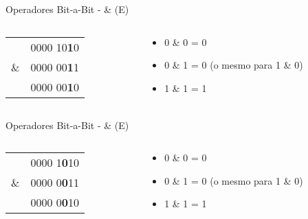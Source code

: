 \documentclass[t, aspectratio=169]{beamer}
\begin{document}
\begin{frame}[label={sec:org2089767}]{Operadores Bit-a-Bit - \& (E)}
\begin{columns}
\begin{column}{0.5\columnwidth}
\begin{center}
\begin{tabular}{cc}
 & 0000 10{\bfseries\color{highlight}1}0\\
\& & 0000 00{\bfseries\color{highlight}1}1\\
\hline
 & 0000 00{\bfseries\color{highlight}1}0\\
\end{tabular}
\end{center}
\end{column}

\begin{column}{0.5\columnwidth}
\begin{itemize}
\item 0 \& 0 = 0
\item 0 \& 1 = 0 (o mesmo para 1 \& 0)
\item \alert{\color{highlight}1 \& 1 = 1}
\end{itemize}
\end{column}
\end{columns}
\end{frame}

\begin{frame}[label={sec:org7ea9075}]{Operadores Bit-a-Bit - \& (E)}
\begin{columns}
\begin{column}{0.5\columnwidth}
\begin{center}
\begin{tabular}{cc}
 & 0000 1{\bfseries\color{highlight}0}10\\
\& & 0000 0{\bfseries\color{highlight}0}11\\
\hline
 & 0000 0{\bfseries\color{highlight}0}10\\
\end{tabular}
\end{center}
\end{column}

\begin{column}{0.5\columnwidth}
\begin{itemize}
\item \alert{\color{highlight}0 \& 0 = 0}
\item 0 \& 1 = 0 (o mesmo para 1 \& 0)
\item 1 \& 1 = 1
\end{itemize}
\end{column}
\end{columns}
\end{frame}
\end{document}
